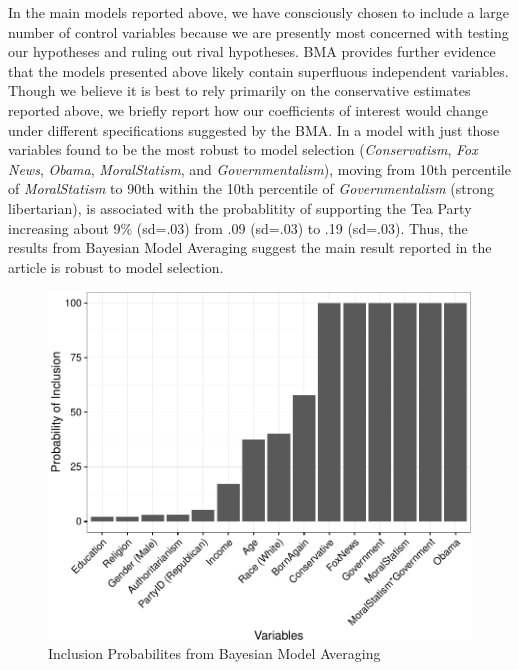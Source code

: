 \documentclass[12pt,]{article}
\begin{document}
In the main models reported above, we have consciously chosen to include
a large number of control variables because we are presently most
concerned with testing our hypotheses and ruling out rival hypotheses.
BMA provides further evidence that the models presented above likely
contain superfluous independent variables. Though we believe it is best
to rely primarily on the conservative estimates reported above, we
briefly report how our coefficients of interest would change under
different specifications suggested by the BMA. In a model with just
those variables found to be the most robust to model selection
(\emph{Conservatism}, \emph{Fox News}, \emph{Obama},
\emph{MoralStatism}, and \emph{Governmentalism}), moving from 10th
percentile of \emph{MoralStatism} to 90th within the 10th percentile of
\emph{Governmentalism} (strong libertarian), is associated with the
probablitity of supporting the Tea Party increasing about 9\% (sd=.03)
from .09 (sd=.03) to .19 (sd=.03). Thus, the results from Bayesian Model
Averaging suggest the main result reported in the article is robust to model
selection.

\begin{figure}[htbp]
\centering
\includegraphics{figures/bma2-1.pdf}
\caption{Inclusion Probabilites from Bayesian Model Averaging}
\end{figure}

\clearpage
\end{document}
